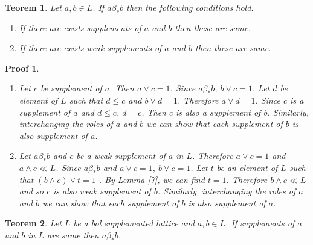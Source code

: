 \documentclass[a4paper,12pt]{article}
\numberwithin{equation}{section}
\theoremstyle{italik}
\newtheorem{teorem}{Teorem}[section]
\newtheorem*{ispat}{Proof}
\begin{document}
\begin{teorem}\label{8}
  Let $ a,b \in L $. If $ a\beta_* b $ then the following conditions hold.
  \begin{enumerate}[label=(\roman{*}), ref=(\roman{*})]
      \item
        If there are exists supplements of $ a $ and $ b $ then these are same. \label{8.1}
      \item
        If there are exists weak supplements of $ a $ and $ b $ then these are same. \label{8.2}
    \end{enumerate}
\end{teorem}
\begin{ispat}
  \begin{enumerate}
    \item
      Let $ c $ be supplement of $ a $. Then $ a \vee c = 1 $. Since $ a \beta_* b $, $ b \vee c=1 $.
      Let $ d $ be element of $ L $ such that $ d \leq c $ and $ b \vee d = 1 $. Therefore 
      $ a \vee d = 1 $. Since $ c $ is a supplement of $ a $ and $ d \leq c $, $ d = c $. Then 
      $ c $ is also a supplement of $ b $. Similarly, interchanging the roles of $ a $ and $ b $ 
      we can show that each supplement of $ b $ is also supplement of $ a $.
    \item
      Let $ a \beta_* b $ and $ c $ be a weak supplement of $ a $ in $ L $. Therefore $ a \vee c = 1 $ 
      and $ a \wedge c \ll L $. Since $ a \beta_* b $ and $ a \vee c = 1 $, $ b \vee c = 1 $. 
      Let $ t $ be an element of $ L $ such that $ (b \wedge c ) \vee t = 1 $ . By Lemma \ref{7}, 
      we can find $ t = 1 $. Therefore $ b \wedge c \ll L $ and so $ c $ is also weak supplement of $ b $. 
      Similarly, interchanging the roles of $ a $ and $ b $ we can show that each supplement of $ b $ 
      is also supplement of $ a $.
  \end{enumerate}
\end{ispat}




\begin{teorem}\label{9}
  Let $ L $ be a bol supplemented lattice and $ a,b \in L $. If supplements of $ a $ and $ b $ in $ L $ 
  are same then $ a \beta_* b $.
\end{teorem}
\end{document}
